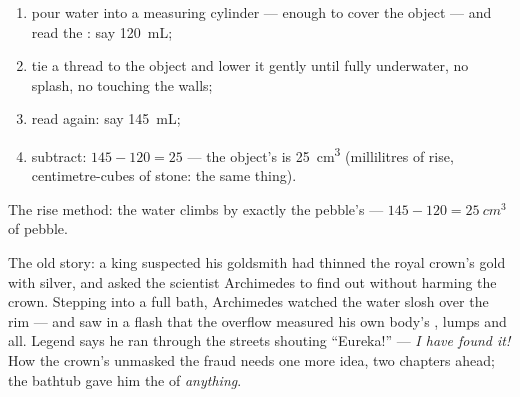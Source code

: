 \begin{method}\label{met:g6:mass-and-volume:rise}
\begin{enumerate}
  \item pour water into a measuring cylinder --- enough to cover
        the object --- and read the : say \qty{120}{mL};
  \item tie a thread to the object and lower it gently until fully
        underwater, no splash, no touching the walls;
  \item read again: say \qty{145}{mL};
  \item subtract: $145 - 120 = 25$ --- the object's  is
        \qty{25}{cm^3} (millilitres of rise, centimetre-cubes of
        stone: the same thing).
\end{enumerate}
\end{method}

\begin{omfigure}

{\small The rise method: the water climbs by exactly the pebble's
 --- $145 - 120 = \qty{25}{cm^3}$ of pebble.}
\end{omfigure}

\begin{example}\label{ex:g6:mass-and-volume:archimedes}
The old story: a king suspected his goldsmith had thinned the royal
crown's gold with silver, and asked the scientist Archimedes to
find out without harming the crown. Stepping into a full bath,
Archimedes watched the water slosh over the rim --- and saw in a
flash that the overflow measured his own body's , lumps and
all. Legend says he ran through the streets shouting ``Eureka!''
--- \emph{I have found it!} How the crown's  unmasked the
fraud needs one more idea, two chapters ahead; the bathtub gave him
the  of \emph{anything}.
\end{example}

